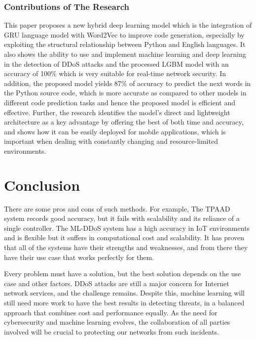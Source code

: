 \documentclass[a4paper, 12pt]{article}
\begin{document}
\subsubsection{Contributions of The Research}
This paper proposes a new hybrid deep learning model which is the integration of GRU language model with Word2Vec to improve code generation, especially by exploiting the structural relationship between Python and English languages. It also shows the ability to use and implement machine learning and deep learning in the detection of DDoS attacks and the processed LGBM model with an accuracy of 100\% which is very suitable for real-time network security. In addition, the proposed model yields 87\% of accuracy to predict the next words in the Python source code, which is more accurate as compared to other models in different code prediction tasks and hence the proposed model is efficient and effective. Further, the research identifies the model’s direct and lightweight architecture as a key advantage by offering the best of both time and accuracy, and shows how it can be easily deployed for mobile applications, which is important when dealing with constantly changing and resource-limited environments.

\clearpage

\section{Conclusion}

There are some pros and cons of such methods. For example, The TPAAD system records good accuracy, but it fails with scalability and its reliance of a single controller.  The ML-DDoS system has a high accuracy in IoT environments and is flexible but it suffers in computational cost and scalability. \cite{4} It has proven that all of the systems have their strengths and weaknesses, and from there they have their use case that works perfectly for them. 

Every problem must have a solution, but the best solution depends on the use case and other factors. DDoS attacks are still a major concern for Internet network services, and the challenge remains. Despite this, machine learning will still need more work to have the best results in detecting threats, in a balanced approach that combines cost and performance equally. As the need for cybersecurity and machine learning evolves, the collaboration of all parties involved will be crucial to protecting our networks from such incidents. 
\end{document}
